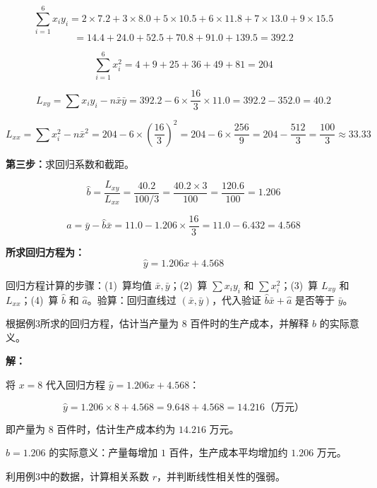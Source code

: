 \documentclass[12pt, a4paper]{ctexart}
\begin{document}
\[
\sum_{i=1}^{6}x_iy_i = 2\times7.2 + 3\times8.0 + 5\times10.5 + 6\times11.8 + 7\times13.0 + 9\times15.5
\]
\[
= 14.4 + 24.0 + 52.5 + 70.8 + 91.0 + 139.5 = 392.2
\]

\[
\sum_{i=1}^{6}x_i^2 = 4 + 9 + 25 + 36 + 49 + 81 = 204
\]

\[
L_{xy} = \sum x_iy_i - n\bar{x}\bar{y} = 392.2 - 6 \times \frac{16}{3} \times 11.0 = 392.2 - 352.0 = 40.2
\]

\[
L_{xx} = \sum x_i^2 - n\bar{x}^2 = 204 - 6 \times \left(\frac{16}{3}\right)^2 = 204 - 6 \times \frac{256}{9} = 204 - \frac{512}{3} = \frac{100}{3} \approx 33.33
\]

\medskip
\textbf{第三步：}求回归系数和截距。

\[
\hat{b} = \frac{L_{xy}}{L_{xx}} = \frac{40.2}{100/3} = \frac{40.2 \times 3}{100} = \frac{120.6}{100} = 1.206
\]

\[
\hat{a} = \bar{y} - \hat{b}\bar{x} = 11.0 - 1.206 \times \frac{16}{3} = 11.0 - 6.432 = 4.568
\]

\medskip
\textbf{所求回归方程为：}
\[
\boxed{\hat{y} = 1.206x + 4.568}
\]

\begin{tipbox}[方法总结]
回归方程计算的步骤：(1)~算均值 $\bar{x}, \bar{y}$；(2)~算 $\sum x_iy_i$ 和 $\sum x_i^2$；(3)~算 $L_{xy}$ 和 $L_{xx}$；(4)~算 $\hat{b}$ 和 $\hat{a}$。验算：回归直线过 $(\bar{x}, \bar{y})$，代入验证 $\hat{b}\bar{x} + \hat{a}$ 是否等于 $\bar{y}$。
\end{tipbox}

\bigskip

\begin{examplebox}[【例4】回归方程的预测]
根据例3所求的回归方程，估计当产量为 $8$ 百件时的生产成本，并解释 $\hat{b}$ 的实际意义。
\end{examplebox}

\textbf{解：}

将 $x = 8$ 代入回归方程 $\hat{y} = 1.206x + 4.568$：

\[
\hat{y} = 1.206 \times 8 + 4.568 = 9.648 + 4.568 = 14.216 \text{（万元）}
\]

即产量为 $8$ 百件时，估计生产成本约为 $\boxed{14.216}$ 万元。

\medskip
$\hat{b} = 1.206$ 的实际意义：产量每增加 $1$ 百件，生产成本平均增加约 $1.206$ 万元。

\bigskip

\begin{examplebox}[【例5】相关系数的计算与判断]
利用例3中的数据，计算相关系数 $r$，并判断线性相关性的强弱。
\end{examplebox}
\end{document}
